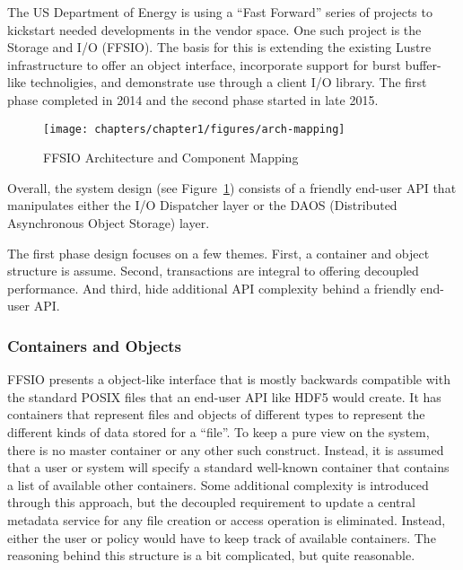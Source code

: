 The US Department of Energy is using a ``Fast Forward'' series of projects to
kickstart needed developments in the vendor space. One such project is the
Storage and I/O (FFSIO). The basis for this is extending the existing Lustre
infrastructure to offer an object interface, incorporate support for burst
buffer-like technoligies, and demonstrate use through a client I/O library. 
The first phase completed in 2014 and the second phase started in late 2015.

\begin{figure}[htbp]
\vspace{-0.10in}
\centering
\texttt{[image: chapters/chapter1/figures/arch-mapping]}
\vspace{-0.15in}
\caption{FFSIO Architecture and Component Mapping}
\label{fig:arch-mapping}
\vspace{-0.15in}
\end{figure}

Overall, the system design (see Figure~\ref{fig:arch-mapping}) consists of a
friendly end-user API that manipulates either the I/O Dispatcher layer or the
DAOS (Distributed Asynchronous Object Storage) layer.

The first phase design focuses on a few themes. First, a container and object
structure is assume. Second, transactions are integral to offering decoupled
performance. And third, hide additional API complexity behind a friendly
end-user API.

\subsubsection{Containers and Objects}
FFSIO presents a object-like interface that is mostly backwards compatible with
the standard POSIX files that an end-user API like HDF5 would create. It has
containers that represent files and objects of different types to represent
the different kinds of data stored for a ``file''. To keep a pure view on the
system, there is no master container or any other such construct. Instead, it 
is assumed that a user or system will specify a standard well-known container
that contains a list of available other containers. Some additional complexity
is introduced through this approach, but the decoupled requirement to update a
central metadata service for any file creation or access operation is
eliminated. Instead, either the user or policy would have to keep track of
available containers. The reasoning behind this structure is a bit complicated,
but quite reasonable.

